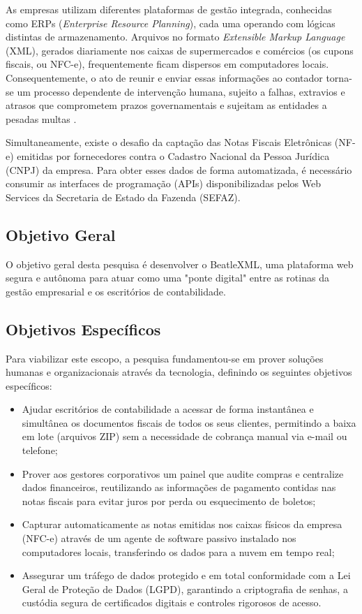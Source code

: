 \documentclass[12pt]{article}
\begin{document}
As empresas utilizam diferentes plataformas de gestão integrada, conhecidas como ERPs (\textit{Enterprise Resource Planning}), cada uma operando com lógicas distintas de armazenamento. Arquivos no formato \textit{Extensible Markup Language} (XML), gerados diariamente nos caixas de supermercados e comércios (os cupons fiscais, ou NFC-e), frequentemente ficam dispersos em computadores locais. Consequentemente, o ato de reunir e enviar essas informações ao contador torna-se um processo dependente de intervenção humana, sujeito a falhas, extravios e atrasos que comprometem prazos governamentais e sujeitam as entidades a pesadas multas \cite{tavares2018}.

Simultaneamente, existe o desafio da captação das Notas Fiscais Eletrônicas (NF-e) emitidas por fornecedores contra o Cadastro Nacional da Pessoa Jurídica (CNPJ) da empresa. Para obter esses dados de forma automatizada, é necessário consumir as interfaces de programação (APIs) disponibilizadas pelos Web Services da Secretaria de Estado da Fazenda (SEFAZ).


\subsection{Objetivo Geral}

O objetivo geral desta pesquisa é desenvolver o BeatleXML, uma plataforma web segura e autônoma para atuar como uma "ponte digital" entre as rotinas da gestão empresarial e os escritórios de contabilidade. 

\subsection{Objetivos Específicos}

Para viabilizar este escopo, a pesquisa fundamentou-se em prover soluções humanas e organizacionais através da tecnologia, definindo os seguintes objetivos específicos:
\begin{itemize}
    \item Ajudar escritórios de contabilidade a acessar de forma instantânea e simultânea os documentos fiscais de todos os seus clientes, permitindo a baixa em lote (arquivos ZIP) sem a necessidade de cobrança manual via e-mail ou telefone;
    \item Prover aos gestores corporativos um painel que audite compras e centralize dados financeiros, reutilizando as informações de pagamento contidas nas notas fiscais para evitar juros por perda ou esquecimento de boletos;
    \item Capturar automaticamente as notas emitidas nos caixas físicos da empresa (NFC-e) através de um agente de software passivo instalado nos computadores locais, transferindo os dados para a nuvem em tempo real;
    \item Assegurar um tráfego de dados protegido e em total conformidade com a Lei Geral de Proteção de Dados (LGPD), garantindo a criptografia de senhas, a custódia segura de certificados digitais e controles rigorosos de acesso.
\end{itemize}
\end{document}
